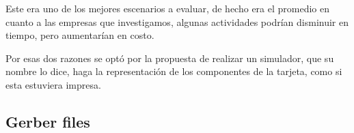 Este era uno de los mejores escenarios a evaluar, de hecho era el promedio en cuanto a las empresas que investigamos, algunas actividades podrían disminuir en tiempo, pero aumentarían en costo.

Por esas dos razones se optó por la propuesta de realizar un simulador, que su nombre lo dice, haga la representación de los componentes de la tarjeta, como si esta estuviera impresa.

\subsection{Gerber files}


